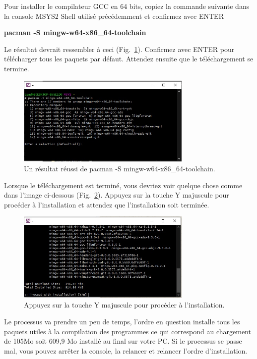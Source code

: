\documentclass{article}
\newcommand\fig[1]{{Fig.~\ref{#1}}}
\begin{document}
Pour installer le compilateur GCC en 64 bits, copiez la commande suivante dans la console MSYS2 Shell utilisé précédemment et confirmez avec ENTER 
\begin{tcolorbox}[width=\textwidth,colframe=Purple,colback={black},title={Ceci est la console MSYS2 Shell},outer arc=0mm,colupper=white]    
      \large\textbf{pacman -S mingw-w64-x86\_64-toolchain}
\end{tcolorbox}
Le résultat devrait ressembler à ceci (\fig{F:GNUInstall1}). Confirmez avec ENTER pour télécharger tous les paquets par défaut. Attendez ensuite que le téléchargement se termine.
\begin{figure}[H]
\center
\includegraphics[width=0.75\textwidth]{Plots/Msys2_11GNU.jpeg}
\caption{Un résultat réussi de pacman -S mingw-w64-x86\_64-toolchain.\label{F:GNUInstall1}}
\end{figure}
Lorsque le téléchargement est terminé, vous devriez voir quelque chose comme dans l'image ci-dessous (\fig{F:GNUInstall2}). Appuyez sur la touche Y majuscule pour procéder à l'installation et attendez que l'installation soit terminée.
\begin{figure}[H]
\center
\includegraphics[width=0.75\textwidth]{Plots/Msys2_12Gnu.jpg}
\caption{Appuyez sur la touche Y majuscule pour procéder à l'installation.\label{F:GNUInstall2}}
\end{figure}
Le processus va prendre un peu de temps, l'ordre en question installe tous les paquets utiles à la compilation des programmes ce qui correspond au chargement de 105Mo soit 609,9 Mo installé au final sur votre PC. Si le processus se passe mal, vous pouvez arrêter la console, la relancer et relancer l'ordre d'installation.
\end{document}
